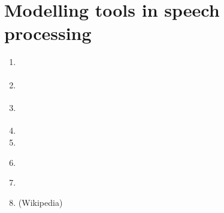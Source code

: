 \documentclass[letterpaper,10pt,english]{jupyterBook}
\begin{document}
\chapter{Modelling tools in speech processing}
\label{\detokenize{Modelling_tools_in_speech_processing:modelling-tools-in-speech-processing}}\label{\detokenize{Modelling_tools_in_speech_processing::doc}}\begin{enumerate}
%
\item {} 
\sphinxAtStartPar
{\hyperref[\detokenize{Modelling/Source_modelling_and_perceptual_modelling::doc}]{}}

\item {} 
\sphinxAtStartPar
{\hyperref[\detokenize{Modelling/Linear_regression::doc}]{}}

\item {} 
\sphinxAtStartPar
{\hyperref[\detokenize{Modelling/Sub-space_models::doc}]{}}

\item {} 
\sphinxAtStartPar
{}

\item {} 
\sphinxAtStartPar
{}

\item {} 
\sphinxAtStartPar
{\hyperref[\detokenize{Modelling/Neural_networks::doc}]{}}

\item {} 
\sphinxAtStartPar
{\hyperref[\detokenize{Modelling/Non-negative_Matrix_and_Tensor_Factorization::doc}]{}}

\item {} 
\sphinxAtStartPar
{} (Wikipedia)

\end{enumerate}

\sphinxstepscope
\end{document}
